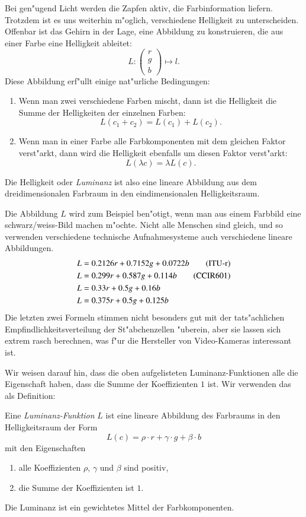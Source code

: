 Bei gen"ugend Licht werden die Zapfen aktiv, die Farbinformation liefern.
Trotzdem ist es uns weiterhin m"oglich, verschiedene Helligkeit
zu unterscheiden.
Offenbar ist das Gehirn in der Lage, eine Abbildung zu konstruieren,
die aus einer Farbe eine Helligkeit ableitet:
\[
L\colon \begin{pmatrix}r\\g\\b\end{pmatrix}\mapsto l.
\]
Diese Abbildung erf"ullt einige nat"urliche Bedingungen:
\begin{enumerate}
\item Wenn man zwei verschiedene Farben mischt, dann ist die Helligkeit
die Summe der Helligkeiten der einzelnen Farben:
\[
L(c_1 + c_2)=L(c_1) + L(c_2).
\]
\item Wenn man in einer Farbe alle Farbkomponenten mit dem gleichen 
Faktor verst"arkt, dann wird die Helligkeit ebenfalls um diesen Faktor
verst"arkt:
\[
L(\lambda c)=\lambda L(c).
\]
\end{enumerate}
Die Helligkeit oder {\em Luminanz} ist also eine lineare Abbildung
aus dem dreidimensionalen Farbraum in den eindimensionalen Helligkeitsraum.

Die Abbildung $L$ wird zum Beispiel ben"otigt, wenn man aus einem Farbbild
eine schwarz/weiss-Bild machen m"ochte.
Nicht alle Menschen sind gleich, und so verwenden 
verschiedene technische Aufnahmesysteme
auch verschiedene lineare Abbildungen.
\begin{align}
L&=0.2126 r+0.7152 g + 0.0722 b\tag{ITU-r}
\\
L&=0.299 r + 0.587 g + 0.114 b\tag{CCIR601}
\\
L&=0.33 r + 0.5 g + 0.16 b\notag
\\
L&=0.375 r + 0.5 g + 0.125 b\notag
\end{align}
Die letzten zwei Formeln stimmen nicht besonders gut mit der tats"achlichen
Empfindlichkeitsverteilung der St"abchenzellen "uberein, aber sie lassen
sich extrem rasch berechnen, was f"ur die Hersteller von Video-Kameras 
interessant ist.

Wir weisen darauf hin, dass die oben aufgelisteten Luminanz-Funktionen
alle die Eigenschaft haben, dass die Summe der Koeffizienten $1$ ist.
Wir verwenden das als Definition:
\begin{definition} Eine {\em Luminanz-Funktion} $L$ ist eine lineare Abbildung
des Farbraums in den Helligkeitsraum der Form
\[
L(c)=\rho \cdot r + \gamma \cdot g + \beta \cdot b
\]
mit den Eigenschaften
\begin{enumerate}
\item alle Koeffizienten $\rho$, $\gamma$ und $\beta$ sind positiv,
\item die Summe der Koeffizienten ist $1$.
\end{enumerate}
\end{definition}
Die Luminanz ist ein gewichtetes Mittel der Farbkomponenten.

